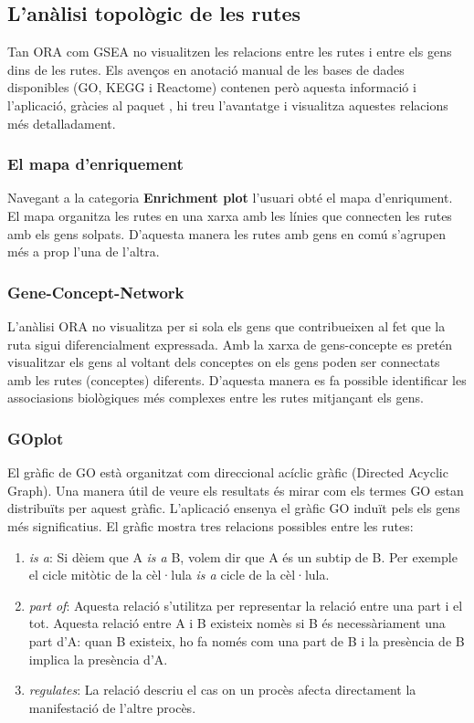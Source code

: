 \documentclass[]{article}
\begin{document}
\subsection{L'anàlisi topològic de les rutes}
Tan ORA com GSEA no visualitzen les relacions entre les rutes i entre els gens dins de les rutes. Els avenços en anotació manual de les bases de dades disponibles (GO, KEGG i Reactome) contenen però aquesta informació i l'aplicació, gràcies al paquet , hi treu l'avantatge i visualitza aquestes relacions més detalladament. 

\subsubsection{El mapa d'enriquement}

Navegant a la categoria \textbf{Enrichment plot} l'usuari obté el mapa d'enriqument. El mapa organitza les rutes en una xarxa amb les línies que connecten les rutes amb els gens solpats. D'aquesta manera les rutes amb gens en comú s'agrupen més a prop l'una de l'altra.

\subsubsection{Gene-Concept-Network}

L'anàlisi ORA no visualitza per si sola els gens que contribueixen al fet que la ruta sigui diferencialment expressada. Amb la xarxa de gens-concepte es pretén visualitzar els gens al voltant dels conceptes on els gens poden ser connectats amb les rutes (conceptes) diferents. D'aquesta manera es fa possible identificar les associasions biològiques més complexes entre les rutes mitjançant els gens. 

\subsubsection{GOplot}

El gràfic de GO està organitzat com direccional acíclic gràfic (Directed Acyclic Graph). Una manera útil de veure els resultats és mirar com els termes GO estan distribuïts per aquest gràfic. L'aplicació ensenya el gràfic GO induït pels els gens més significatius. El gràfic mostra tres relacions possibles entre les rutes: 
\begin{enumerate}
\item \textit{is a}: Si dèiem que A \textit{is a} B, volem dir que A és un subtip de B. Per exemple el cicle mitòtic de la cèl·lula \textit{is a} cicle de la cèl·lula. 
\item \textit{part of}: Aquesta relació s'utilitza per representar la relació entre una part i el tot. Aquesta relació entre A i B existeix nomès si B és necessàriament una part d'A: quan B existeix, ho fa només com una part de B i la presència de B implica la presència d’A.
\item \textit{regulates}: La relació descriu el cas on un procès afecta directament la manifestació de l'altre procès.
\end{enumerate}
\end{document}
